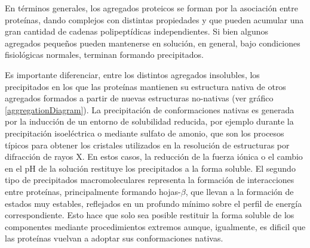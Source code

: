 
En términos generales, los agregados proteicos se forman por la asociación entre proteínas, dando complejos con distintas propiedades y que pueden acumular una gran cantidad de cadenas polipeptídicas independientes.
Si bien algunos agregados pequeños pueden mantenerse en solución, en general, bajo condiciones fisiológicas normales, terminan formando precipitados.

Es importante diferenciar, entre los distintos agregados insolubles, los precipitados en los que las proteínas mantienen su estructura nativa de otros agregados formados a partir de nuevas estructuras no-nativas (ver gráfico \ref{aggregationDiagram}).
La precipitación de conformaciones nativas es generada por la inducción de un entorno de solubilidad reducida, por ejemplo durante la precipitación isoeléctrica o mediante sulfato de amonio,
que son los procesos típicos para obtener los cristales utilizados en la resolución de estructuras por difracción de rayos X. 
En estos casos, la reducción de la fuerza iónica o el cambio en el pH de la solución restituye los precipitados a la forma soluble.
El segundo tipo de precipitados macromoleculares representa la formación de interacciones entre proteínas, principalmente formando hojas-$\beta$, que llevan a la formación de estados muy estables, 
reflejados en un profundo mínimo sobre el perfil de energía correspondiente. 
Esto hace que solo sea posible restituir la forma soluble de los componentes mediante procedimientos extremos aunque, igualmente, es dificil que las proteínas vuelvan a adoptar sus conformaciones nativas.

